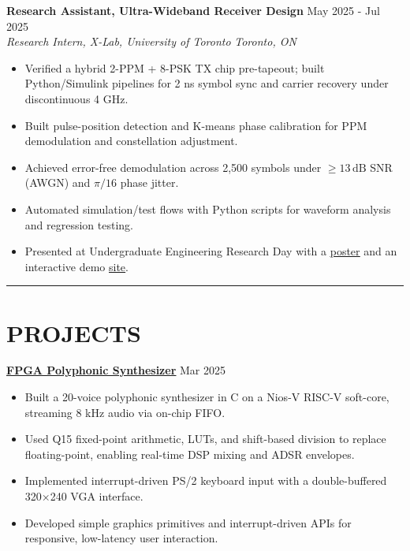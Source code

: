 \documentclass[letterpaper,10pt]{article}
\begin{document}
\vspace{0.2cm}
\noindent
\textbf{Research Assistant, Ultra-Wideband Receiver Design} \hfill May 2025 - Jul 2025\\
\textit{Research Intern, X-Lab, University of Toronto} \hfill \textit{Toronto, ON}
\begin{itemize}[leftmargin=0.2in]
    \item Verified a hybrid 2-PPM + 8-PSK TX chip pre-tapeout; built Python/Simulink pipelines for 2 ns symbol sync and carrier recovery under discontinuous 4 GHz.
	\item Built pulse-position detection and K-means phase calibration for PPM demodulation and constellation adjustment.
    \item Achieved error-free demodulation across 2,500 symbols under $\geq 13\,\mathrm{dB}$ SNR (AWGN) and $\pi/16$ phase jitter.
    \item Automated simulation/test flows with Python scripts for waveform analysis and regression testing.
    \item Presented at Undergraduate Engineering Research Day with a \href{https://docs.google.com/presentation/d/1h4lmc_HQLzNvtGE4oE1jedOlNVZjL3iztEyGKnC-ico/edit?usp=sharing}{\uline{poster}} and an interactive demo \href{https://github.com/Ken-2511/ppm-psk-visualize}{\uline{site}}.
\end{itemize}

\noindent\rule{\linewidth}{1pt}

\section*{\textbf{PROJECTS}}

\noindent\href{https://github.com/alexzjm/ece243-sound-synthesizer}{\uline{
\textbf{FPGA Polyphonic Synthesizer}}} \hfill Mar 2025
\begin{itemize}[leftmargin=0.2in]
  \item Built a 20-voice polyphonic synthesizer in C on a Nios-V RISC-V soft-core, streaming 8 kHz audio via on-chip FIFO.
  \item Used Q15 fixed-point arithmetic, LUTs, and shift-based division to replace floating-point, enabling real-time DSP mixing and ADSR envelopes.
  \item Implemented interrupt-driven PS/2 keyboard input with a double-buffered 320×240 VGA interface.
  \item Developed simple graphics primitives and interrupt-driven APIs for responsive, low-latency user interaction.
\end{itemize}
\end{document}
